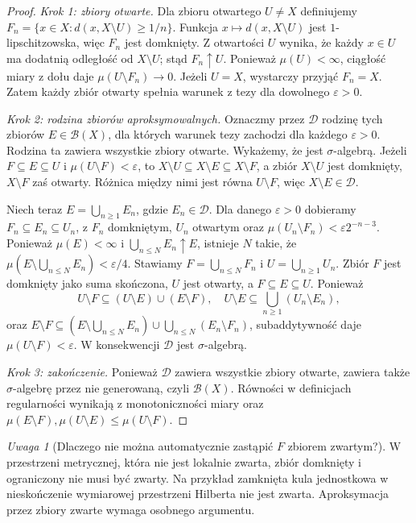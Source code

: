 \documentclass[11pt,a4paper,oneside]{book}
\numberwithin{equation}{chapter}
\theoremstyle{plain}
\theoremstyle{definition}
\theoremstyle{remark}
\newtheorem{uwaga}[twierdzenie]{Uwaga}
\begin{document}
\begin{proof}
\emph{Krok 1: zbiory otwarte.}
Dla zbioru otwartego $U\neq X$ definiujemy
$F_n=\{x\in X:d(x,X\setminus U)\ge1/n\}$.
Funkcja $x\mapsto d(x,X\setminus U)$ jest
$1$-lipschitzowska, więc $F_n$ jest domknięty.
Z otwartości $U$ wynika, że każdy $x\in U$
ma dodatnią odległość od $X\setminus U$;
stąd $F_n\uparrow U$. Ponieważ $\mu(U)<\infty$,
ciągłość miary z dołu daje
$\mu(U\setminus F_n)\to0$. Jeżeli $U=X$,
wystarczy przyjąć $F_n=X$. Zatem każdy zbiór otwarty
spełnia warunek z tezy dla dowolnego $\varepsilon>0$.

\emph{Krok 2: rodzina zbiorów aproksymowalnych.}
Oznaczmy przez $\mathcal D$ rodzinę tych zbiorów
$E\in\mathcal B(X)$, dla których warunek tezy zachodzi
dla każdego $\varepsilon>0$. Rodzina ta zawiera wszystkie
zbiory otwarte. Wykażemy, że jest $\sigma$-algebrą.
Jeżeli $F\subseteq E\subseteq U$ i
$\mu(U\setminus F)<\varepsilon$, to
$X\setminus U\subseteq X\setminus E\subseteq X\setminus F$,
a zbiór $X\setminus U$ jest domknięty,
$X\setminus F$ zaś otwarty. Różnica między nimi
jest równa $U\setminus F$, więc $X\setminus E\in\mathcal D$.

Niech teraz $E=\bigcup_{n\ge1}E_n$, gdzie $E_n\in\mathcal D$.
Dla danego $\varepsilon>0$ dobieramy
$F_n\subseteq E_n\subseteq U_n$, z $F_n$ domkniętym,
$U_n$ otwartym oraz
$\mu(U_n\setminus F_n)<\varepsilon2^{-n-3}$.
Ponieważ $\mu(E)<\infty$ i
$\bigcup_{n\le N}E_n\uparrow E$, istnieje $N$ takie,
że $\mu(E\setminus\bigcup_{n\le N}E_n)<\varepsilon/4$.
Stawiamy $F=\bigcup_{n\le N}F_n$ i $U=\bigcup_{n\ge1}U_n$.
Zbiór $F$ jest domknięty jako suma skończona,
$U$ jest otwarty, a $F\subseteq E\subseteq U$.
Ponieważ
\[
U\setminus F\subseteq
(U\setminus E)\cup(E\setminus F),
\quad
U\setminus E\subseteq\bigcup_{n\ge1}(U_n\setminus E_n),
\]
oraz
$E\setminus F\subseteq
(E\setminus\bigcup_{n\le N}E_n)
\cup\bigcup_{n\le N}(E_n\setminus F_n)$,
subaddytywność daje
$\mu(U\setminus F)<\varepsilon$.
W konsekwencji $\mathcal D$ jest $\sigma$-algebrą.

\emph{Krok 3: zakończenie.}
Ponieważ $\mathcal D$ zawiera wszystkie zbiory otwarte,
zawiera także $\sigma$-algebrę przez nie generowaną,
czyli $\mathcal B(X)$. Równości w definicjach regularności
wynikają z monotoniczności miary oraz
$\mu(E\setminus F),\mu(U\setminus E)\le\mu(U\setminus F)$.
\end{proof}

\begin{uwaga}[Dlaczego nie można automatycznie zastąpić $F$ zbiorem zwartym?]
W przestrzeni metrycznej, która nie jest lokalnie zwarta,
zbiór domknięty i ograniczony nie musi być zwarty.
Na przykład zamknięta kula jednostkowa w nieskończenie
wymiarowej przestrzeni Hilberta nie jest zwarta.
Aproksymacja przez zbiory zwarte wymaga osobnego argumentu.
\end{uwaga}
\end{document}
